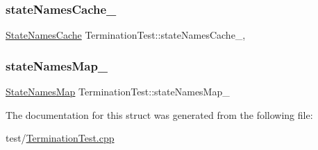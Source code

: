 \subsubsection{\texorpdfstring{state\+Names\+Cache\+\_\+}{stateNamesCache\_}}
{\footnotesize\ttfamily \mbox{\hyperlink{struct_termination_test_a410a8e606d2928905c6fffcafaf34bbb}{State\+Names\+Cache}} Termination\+Test\+::state\+Names\+Cache\+\_\+\hspace{0.3cm}{\ttfamily [mutable]}, {\ttfamily [private]}}

\mbox{\label{struct_termination_test_ad2693f04b3af0af6781c1af3d474d7b8}} 
\subsubsection{\texorpdfstring{state\+Names\+Map\+\_\+}{stateNamesMap\_}}
{\footnotesize\ttfamily \mbox{\hyperlink{struct_termination_test_ad548ac63b569644d5f8a7fcc452a1729}{State\+Names\+Map}} Termination\+Test\+::state\+Names\+Map\+\_\+\hspace{0.3cm}{\ttfamily [private]}}



The documentation for this struct was generated from the following file\+:\begin{DoxyCompactItemize}
\item 
test/\mbox{\hyperlink{_termination_test_8cpp}{Termination\+Test.\+cpp}}\end{DoxyCompactItemize}
